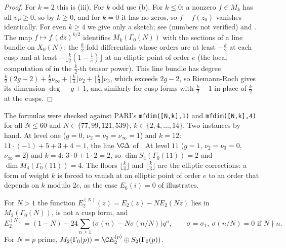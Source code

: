 \begin{proof}
For $k=2$ this is (iii). For $k$ odd use (b). For $k\le0$: a nonzero $f\in M_k$ has all $v_P\ge0$, so by
 $k\ge0$, and for $k=0$ it has no zeros, so $f-f(z_0)$ vanishes identically. For even $k\ge4$ we give only a sketch; see
\cite[Theorems 3.5.1 and 3.6.1]{DiamondShurman} (numbers not verified) and \cite[Section 2.6]{Shimura71}. The map $f\mapsto f\,(dz)^{k/2}$ identifies $M_k(\Gamma_0(N))$ with the sections of a
line bundle on $X_0(N)$: the $\frac k2$-fold differentials whose orders are at least $-\frac k2$ at each cusp and at least $-\lfloor\frac k2(1-\frac1e)\rfloor$ at an elliptic point of order $e$
(the local computation of  in the $\frac k2$-th tensor power). This line bundle has degree $\frac k2(2g-2)+\frac k2\nu_\infty+\lfloor\frac k4\rfloor\nu_2+\lfloor\frac k3\rfloor\nu_3$,
which exceeds $2g-2$, so Riemann-Roch gives its dimension $\deg-g+1$, and similarly for cusp forms with $\frac k2-1$ in place of $\frac k2$ at the cusps.
\end{proof}

The formulas were checked against PARI's \texttt{mfdim([N,k],1)} and \texttt{mfdim([N,k],4)} for all $N\le60$ and $N\in\{77,99,121,539\}$, $k\in\{2,4,\dots,14\}$.
Two instances by hand. At level one ($g=0$, $\nu_2=\nu_3=\nu_\infty=1$) and $k=12$: $11\cdot(-1)+5+3+4=1$, the line $\C\Delta$ of . At level $11$
($g=1$, $\nu_2=\nu_3=0$, $\nu_\infty=2$) and $k=4$: $3\cdot0+1\cdot2=2$, so $\dim S_4(\Gamma_0(11))=2$ and $\dim M_4(\Gamma_0(11))=4$. The floors $\lfloor\frac k4\rfloor$ and
$\lfloor\frac k3\rfloor$ are the elliptic corrections: a form of weight $k$ is forced to vanish at an elliptic point of order $e$ to an order that depends on $k$ modulo $2e$, as
the case $E_6(i)=0$ of  illustrates.

\begin{proposition}\label{prop:modforms:eisenstein-weight-two}
For $N>1$ the function $E_2^{(N)}(z)=E_2(z)-NE_2(Nz)$ lies in $M_2(\Gamma_0(N))$, is not a cusp form, and
\[
E_2^{(N)}=(1-N)-24\sum_{n\ge1}\bigl(\sigma(n)-N\sigma(n/N)\bigr)q^n,\qquad\sigma=\sigma_1,\ \sigma(n/N)=0\text{ if }N\nmid n .
\]
For $N=p$ prime, $M_2(\Gamma_0(p))=\C E_2^{(p)}\oplus S_2(\Gamma_0(p))$.
\end{proposition}

